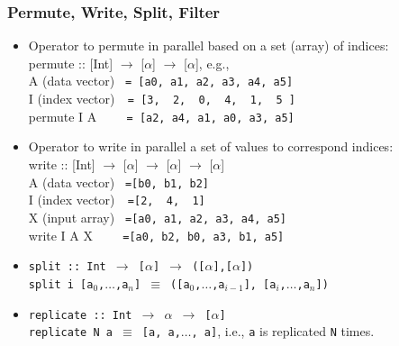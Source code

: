\documentclass{beamer}
\renewcommand{\emph}[1]{\textcolor{structure}{#1}}
\newcommand{\emp}[1]{\textcolor{DikuRed}{ #1}}
\begin{document}
\begin{frame}[fragile,t]
  \frametitle{Permute, Write, Split, Filter}

\begin{itemize}
    \item Operator to \emph{permute in parallel} based on a set (array) of indices:\\
          \emph{permute :: [Int] $\rightarrow$ [$\alpha$] $\rightarrow$ [$\alpha$]}, e.g.,\\
           A (data vector) {\tt~= [a0,~a1,~a2,~a3,~a4,~a5]}\\
           I (index vector){\tt~~= [3,~~2,~~0,~~4,~~1,~~5~]}\\
           \emp{permute I A     {\tt~~~~= [a2,~a4,~a1,~a0,~a3,~a5]}}\bigskip

    \item Operator to \emph{write in parallel} a set of values to 
            correspond indices:\\
          \emph{write :: [Int] $\rightarrow$ [$\alpha$] $\rightarrow$ [$\alpha$] $\rightarrow$ [$\alpha$]}\\
          A (data vector) {\tt~=[b0, b1, b2]}\\
          I (index vector){\tt~~=[2,~~4,~~1]}\\
          X (input array) {\tt~=[a0,~a1,~a2,~a3,~a4,~a5]}\\
          \emp{write I A X     {\tt~~~~=[a0,~b2,~b0,~a3,~b1,~a5]}}\bigskip

    \item %
          \emph{\tt split :: Int $\rightarrow$ [$\alpha$] $\rightarrow$ ([$\alpha$],[$\alpha$])}\\
          \emp{\tt split i [a$_0$,$\ldots$,a$_n$] $\equiv$ ([a$_0$,$\ldots$,a$_{i-1}$], [a$_i$,$\ldots$,a$_{n}$])}\smallskip
    \item \emph{\tt replicate :: Int $\rightarrow$ $\alpha$ $\rightarrow$ [$\alpha$]}\\
            \emp{\tt replicate N a $\equiv$ [a, a,$\ldots$, a]}, i.e., {\tt a} is replicated {\tt N} times.  
 
\end  {itemize}

\end{frame}
\end{document}
